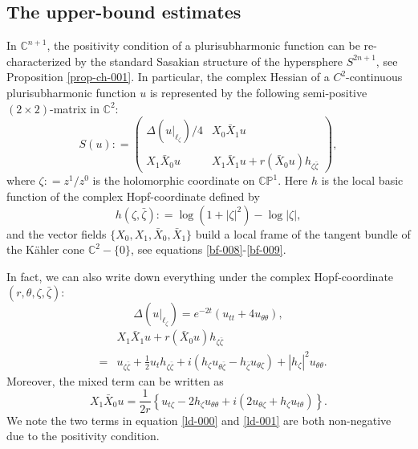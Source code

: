 \documentclass[a4paper,11pt]{amsart}
\numberwithin{equation}{section}
\def\bC{{\mathbb C}}
\def\bP{{\mathbb P}}
\def\z{{\zeta}}
\def\l{{\ell}}
\begin{document}
\subsection{The upper-bound estimates}
In $\bC^{n+1}$, the positivity condition of a plurisubharmonic function 
can be re-characterized by the standard Sasakian structure of the hypersphere $S^{2n+1}$,
see Proposition \ref{prop-ch-001}. 
In particular, the complex Hessian of a $C^2$-continuous plurisubharmonic function $u$
is represented by the following semi-positive $(2\times 2)$-matrix in $\bC^2$: 
$$
S(u): = 
\begin{pmatrix}
\Delta (u|_{\l_{\z}})/4 & X_0 \bar X_{1} u \\
\\
X_{1} \bar X_0 u &  X_{1}\bar X_{1} u + r (\bar X_0 u) h_{\z\bar\z}
\end{pmatrix}, 
$$
where $\z: = z^1/ z^0$ is the holomorphic coordinate on $\bC\bP^1$. 
Here $h$ is the local basic function of the complex Hopf-coordinate  defined by 
$$ h(\z, \bar\z): = \log(1+ |\z|^2) - \log|\z|, $$
and the vector fields $\{ X_0, X_1, \bar X_0, \bar X_1 \}$
build a local frame of the tangent bundle of the K\"ahler cone $\bC^2- \{0\}$, 
see equations \eqref{bf-008}-\eqref{bf-009}. 

In fact, we can also write down everything under the complex Hopf-coordinate $(r, \theta, \z, \bar\z)$: 
\begin{equation}
\label{ld-000}
 \Delta (u|_{\l_{\z}}) = e^{-2t} (u_{tt} + 4 u_{\theta\theta}), 
\end{equation}
\begin{eqnarray}
\label{ld-001}
&& X_{1} \bar X_{1} u + r(\bar X_0 u) h_{\z\bar \z}
\nonumber\\
&=& u_{\z\bar\z} + \frac{1}{2} u_t h_{\z\bar\z} + i (h_\z u_{\theta\bar\z} - h_{\bar\z} u_{\theta\z}) + | h_\z |^2  u_{\theta\theta}. 
\end{eqnarray}
Moreover, the mixed term can be written as 
\begin{equation}
\label{ld-002}
 X_{1} \bar X_{0} u
= \frac{1}{2r} \left\{ u_{t\z} - 2h_{\z}  u_{\theta\theta}   + i ( 2 u_{\theta\z} + h_{\z} u_{t\theta})  \right\}.
\end{equation}
We note the two terms in equation \eqref{ld-000} and \eqref{ld-001}
are both non-negative due to the positivity condition. 
\end{document}

